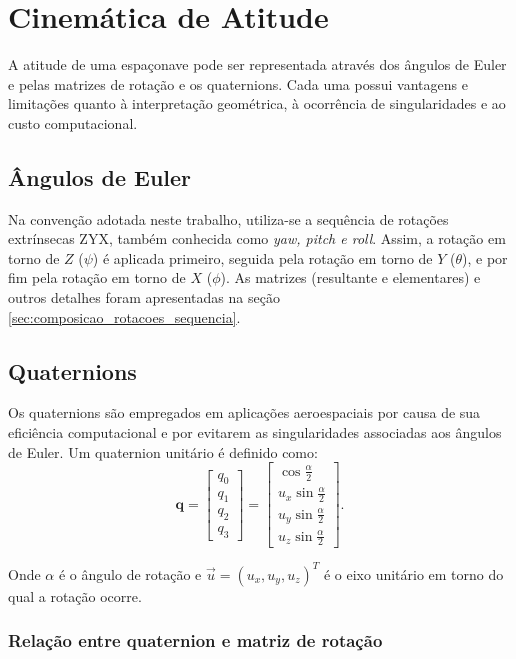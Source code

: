 \section{Cinemática de Atitude}
A atitude de uma espaçonave pode ser representada através dos ângulos de Euler e pelas matrizes de rotação e os quaternions.
Cada uma possui vantagens e limitações quanto à interpretação geométrica, à ocorrência de singularidades e ao custo computacional.

\subsection{Ângulos de Euler}
Na convenção adotada neste trabalho, utiliza-se a sequência de rotações extrínsecas ZYX, também conhecida como \emph{yaw, pitch e roll}.
Assim, a rotação em torno de $Z$ ($\psi$) é aplicada primeiro, seguida pela rotação em torno de $Y$ ($\theta$), e por fim pela rotação em torno de $X$ ($\phi$).
As matrizes (resultante e elementares) e outros detalhes foram apresentadas na seção \eqref{sec:composicao_rotacoes_sequencia}.

\subsection{Quaternions}
Os quaternions são empregados em aplicações aeroespaciais por causa de sua eficiência computacional e por evitarem as singularidades associadas aos ângulos de Euler.
Um quaternion unitário é definido como:
\begin{equation}
\mathbf{q} =
\begin{bmatrix}
q_0 \\ q_1 \\ q_2 \\ q_3
\end{bmatrix}
=
\begin{bmatrix}
\cos\frac{\alpha}{2} \\
u_x \sin\frac{\alpha}{2} \\
u_y \sin\frac{\alpha}{2} \\
u_z \sin\frac{\alpha}{2}
\end{bmatrix}.
\end{equation}

Onde $\alpha$ é o ângulo de rotação e $\vec{u} = (u_x,u_y,u_z)^T$ é o eixo unitário em torno do qual a rotação ocorre.

\subsubsection{Relação entre quaternion e matriz de rotação}

